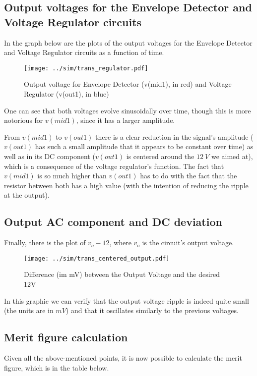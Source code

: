 \subsection{Output voltages for the Envelope Detector and Voltage Regulator circuits}
In the graph below are the plots of the output voltages for the Envelope Detector and Voltage Regulator circuits as a function of time.

\begin{figure}[H] \centering
\texttt{[image: ../sim/trans\_regulator.pdf]}
\caption{Output voltage for Envelope Detector (v(mid1), in red) and Voltage Regulator (v(out1), in blue)}
\label{fig:ngspice_output}
\end{figure}


One can see that both voltages evolve sinusoidally over time, though this is more notorious for $v(mid1)$, since it has a larger amplitude. %

From $v(mid1)$ to $v(out1)$ there is a clear reduction in the signal's amplitude ($v(out1)$ has such a small amplitude that it appears to be constant over time) as well as in its DC component ($v(out1)$ is centered around the $12 \ V$ we aimed at), which is a consequence of the voltage regulator's function.
The fact that $v(mid1)$ is so much higher than $v(out1)$ has to do with the fact that the resistor between both has a high value (with the intention of reducing the ripple at the output).




\subsection{Output AC component and DC deviation}
Finally, there is the plot of $v_o - 12$, where $v_o$ is the circuit's output voltage.

\begin{figure}[H] \centering
\texttt{[image: ../sim/trans\_centered\_output.pdf]}
\caption{Difference (im mV) between the Output Voltage and the desired 12V}
\label{fig:ngspice_centered_output}
\end{figure}

In this graphic we can verify that the output voltage ripple is indeed quite small (the units are in $mV$) and that it oscillates similarly to the previous voltages.




\subsection{Merit figure calculation}
Given all the above-mentioned points, it is now possible to calculate the merit figure, which is in the table below.

